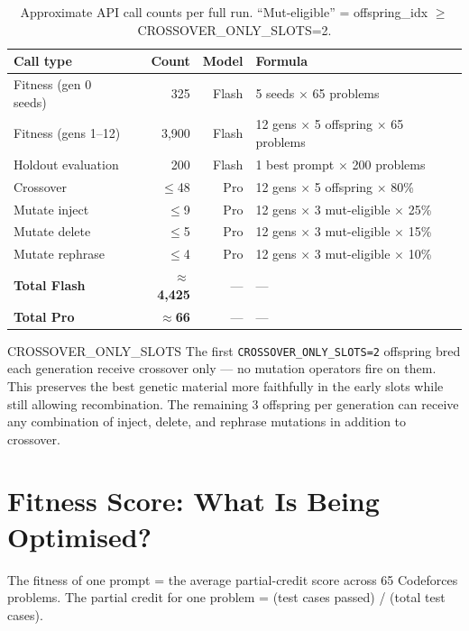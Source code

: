 \documentclass[11pt,a4paper]{report}
\newcommand{\fn}[1]{\texttt{#1}}
\begin{document}
\begin{table}[h]
\centering
\begin{tabular}{@{}lrrl@{}}
\toprule
\textbf{Call type} & \textbf{Count} & \textbf{Model} & \textbf{Formula} \\
\midrule
Fitness (gen 0 seeds)   & 325    & Flash & 5 seeds $\times$ 65 problems \\
Fitness (gens 1--12)    & 3{,}900 & Flash & 12 gens $\times$ 5 offspring $\times$ 65 problems \\
Holdout evaluation      & 200    & Flash & 1 best prompt $\times$ 200 problems \\
Crossover               & $\leq$48 & Pro & 12 gens $\times$ 5 offspring $\times$ 80\% \\
Mutate inject           & $\leq$9  & Pro & 12 gens $\times$ 3 mut-eligible $\times$ 25\% \\
Mutate delete           & $\leq$5  & Pro & 12 gens $\times$ 3 mut-eligible $\times$ 15\% \\
Mutate rephrase         & $\leq$4  & Pro & 12 gens $\times$ 3 mut-eligible $\times$ 10\% \\
\midrule
\textbf{Total Flash}    & $\approx$\textbf{4{,}425} & --- & --- \\
\textbf{Total Pro}      & $\approx$\textbf{66} & --- & --- \\
\bottomrule
\end{tabular}
\caption{Approximate API call counts per full run. ``Mut-eligible'' = offspring\_idx $\geq$ CROSSOVER\_ONLY\_SLOTS=2.}
\end{table}

\begin{conceptbox}{CROSSOVER\_ONLY\_SLOTS}
The first \fn{CROSSOVER\_ONLY\_SLOTS=2} offspring bred each generation receive crossover
only --- no mutation operators fire on them.  This preserves the best genetic material
more faithfully in the early slots while still allowing recombination.  The remaining 3
offspring per generation can receive any combination of inject, delete, and rephrase
mutations in addition to crossover.
\end{conceptbox}

\section{Fitness Score: What Is Being Optimised?}

The fitness of one prompt = the average partial-credit score across 65 Codeforces problems.
The partial credit for one problem = (test cases passed) / (total test cases).
\end{document}
